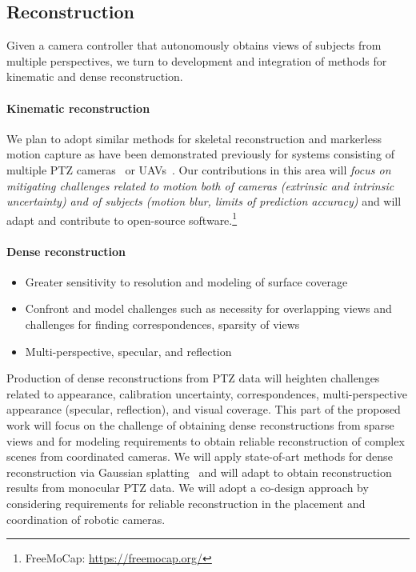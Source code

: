 \documentclass[11pt]{article}
\begin{document}
\subsection{Reconstruction}

Given a camera controller that autonomously obtains views of subjects
from multiple perspectives, we turn to development and integration of
methods for kinematic and dense reconstruction.

\paragraph{Kinematic reconstruction}
We plan to adopt similar methods for skeletal
reconstruction and markerless motion capture as have been demonstrated
previously for systems consisting of multiple PTZ
cameras~\citep{bachmann20193dv} or
UAVs~\citep{saini2019iccv,ho2021iros,hong2024eccv,saini2022ral}.
Our contributions in this area will \emph{focus on mitigating challenges related
to motion both of cameras (extrinsic and intrinsic uncertainty)
and of subjects (motion blur, limits of prediction accuracy)}
and will adapt and contribute to open-source software.\footnote{%
  FreeMoCap: \url{https://freemocap.org/}
}

\paragraph{Dense reconstruction}

\begin{development}
  \begin{itemize}
    \item Greater sensitivity to resolution and modeling of surface coverage
    \item Confront and model challenges such as necessity for overlapping views
      and challenges for finding correspondences, sparsity of views
    \item Multi-perspective, specular, and reflection
  \end{itemize}
\end{development}

Production of dense reconstructions from PTZ data will heighten
challenges related to appearance, calibration uncertainty, correspondences,
multi-perspective appearance (specular, reflection), and visual coverage.
This part of the proposed work will focus on the challenge of
obtaining dense reconstructions from sparse views and for modeling requirements
to obtain reliable reconstruction of complex scenes from coordinated cameras.
We will apply state-of-art methods for dense reconstruction via Gaussian
splatting~\citep{fei20243d,wu20253dgut,kerbl20233d} and will adapt to obtain
reconstruction results from monocular PTZ data.
We will adopt a co-design approach by
considering requirements for reliable reconstruction in the placement and
coordination of robotic cameras.
\end{document}
